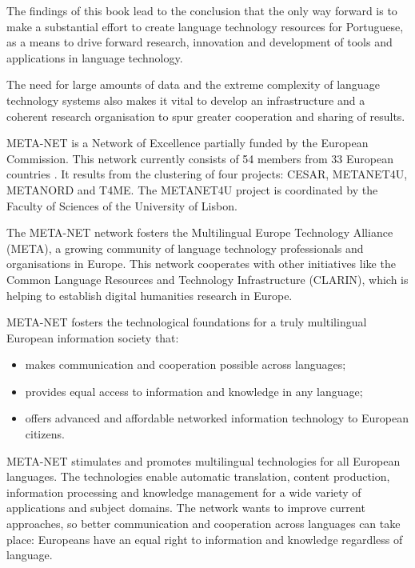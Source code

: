 \begin{multicols}{2}
The findings of this book lead to the conclusion that the only way forward is to make a substantial effort to create language technology resources for Portuguese, as a means to drive forward research, innovation and development of tools and applications in language technology. 

The need for large amounts of data and the extreme complexity of language technology systems also makes it vital to develop an infrastructure and a coherent research organisation to spur greater cooperation and sharing of results.


\end{multicols}

\clearpage


\begin{multicols}{2}
META-NET is a Network of Excellence partially funded by the European Commission. 
This network currently consists of 54 members from 33 European countries \cite{rehm2011}.
It results from the clustering of four projects: CESAR, METANET4U, METANORD and T4ME.
The METANET4U project is coordinated by the Faculty of Sciences of the University of Lisbon.

The META-NET network fosters the Multilingual Europe Technology Alliance (META), a growing community of language technology professionals and organisations in Europe. This network cooperates with other initiatives like the Common Language Resources and Technology Infrastructure (CLARIN), which is helping to establish digital humanities research in Europe. 


META-NET fosters the technological foundations for a truly multilingual European information society that:

\begin{itemize}
\item makes communication and cooperation possible across languages;
\item provides equal access to information and knowledge in any language;
\item offers advanced and affordable networked information technology to European citizens.
\end{itemize}

META-NET stimulates and promotes multilingual technologies for all European languages. The technologies enable automatic translation, content production, information processing and knowledge management for a wide variety of applications and subject domains. The network wants to improve current approaches, so better communication and cooperation across languages can take place: Europeans have an equal right to information and knowledge regardless of language.


\end{multicols}
